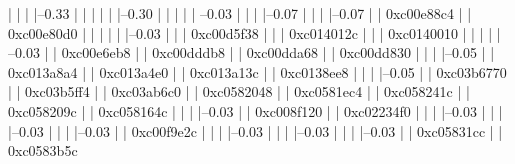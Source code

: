             |          |          
            |          |--0.33%
            |          |          |          
            |          |          |--0.30%
            |          |          |          
            |          |           --0.03%
            |          |          
            |          |--0.07%
            |          |          
            |          |--0.07%
            |          |          0xc00e88c4
            |          |          0xc00e80d0
            |          |          |          
            |          |          |--0.03%
            |          |          |          0xc00d5f38
            |          |          |          0xc014012c
            |          |          |          0xc0140010
            |          |          |          
            |          |           --0.03%
            |          |                     0xc00e6eb8
            |          |                     0xc00dddb8
            |          |                     0xc00dda68
            |          |                     0xc00dd830
            |          |          
            |          |--0.05%
            |          |          0xc013a8a4
            |          |          0xc013a4e0
            |          |          0xc013a13c
            |          |          0xc0138ee8
            |          |          
            |          |--0.05%
            |          |          0xc03b6770
            |          |          0xc03b5ff4
            |          |          0xc03ab6c0
            |          |          0xc0582048
            |          |          0xc0581ec4
            |          |          0xc058241c
            |          |          0xc058209c
            |          |          0xc058164c
            |          |          
            |          |--0.03%
            |          |          0xc008f120
            |          |          0xc02234f0
            |          |          
            |          |--0.03%
            |          |          
            |          |--0.03%
            |          |          
            |          |--0.03%
            |          |          0xc00f9e2c
            |          |          
            |          |--0.03%
            |          |          
            |          |--0.03%
            |          |          
            |          |--0.03%
            |          |          0xc05831cc
            |          |          0xc0583b5c
